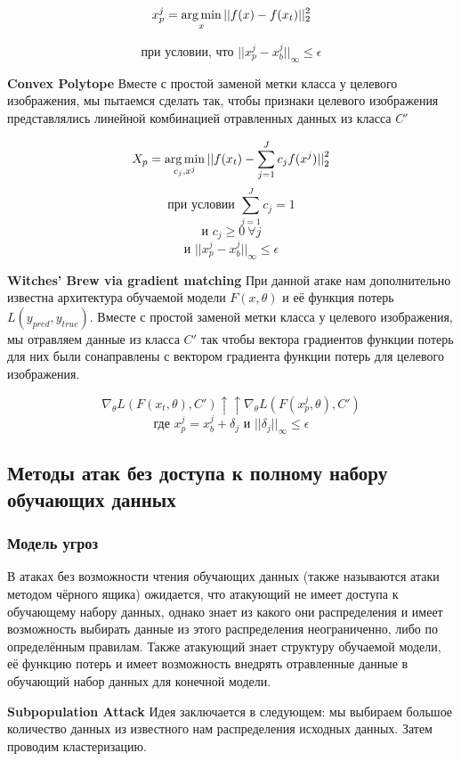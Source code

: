 $$x^{j}_{p} = \operatorname*{arg\,min}_x ||f(x)-f(x_t)||_{2}^{2}$$

$$\text{при условии, что~} ||x_{p}^{j} - x_{b}^{j}||_{\infty} \leq \epsilon$$


\textbf{Convex Polytope}
Вместе с простой заменой метки класса у целевого изображения, мы пытаемся сделать так, чтобы признаки целевого изображения представлялись линейной комбинацией отравленных данных из класса $C'$

$$X_p = \operatorname*{arg\,min}_{c_j, x^j} ||f(x_t) - \sum_{j=1}^{J} c_j f(x^j){||}_{2}^{2}$$
$$\text{при условии~} \sum_{j=1}^{J} c_j = 1$$
$$\text{и~} c_j \geq 0~\forall j$$
$$\text{и~} ||x_{p}^{j} - x_{b}^{j}||_{\infty} \leq \epsilon$$


\textbf{Witches' Brew via gradient matching}
При данной атаке нам дополнительно известна архитектура обучаемой модели $F(x, \theta)$ и её функция потерь $L(y_{pred}, y_{true})$.
Вместе с простой заменой метки класса у целевого изображения, мы отравляем данные из класса $C'$ так чтобы вектора градиентов функции потерь для них были сонаправлены с вектором градиента функции потерь для целевого изображения.

$$\nabla_{\theta} L(F(x_t, \theta), C') \uparrow\uparrow \nabla_{\theta} L(F(x_{p}^{j}, \theta), C')$$
$$\text{где~} x_{p}^{j} = x_{b}^{j} + \delta_j \text{~и~} ||\delta_j||_{\infty} \leq \epsilon$$

\subsection*{Методы атак без доступа к полному набору обучающих данных}


\subsubsection*{Модель угроз}
В атаках без возможности чтения обучающих данных (также называются атаки методом чёрного ящика) ожидается, что атакующий не имеет доступа к обучающему набору данных, однако знает из какого они распределения и имеет возможность выбирать данные из этого распределения неограниченно, либо по определённым правилам. Также атакующий знает структуру обучаемой модели, её функцию потерь и имеет возможность внедрять отравленные данные в обучающий набор данных для конечной модели.

\textbf{Subpopulation Attack}
Идея заключается в следующем: мы выбираем большое количество данных из известного нам распределения исходных данных. Затем проводим кластеризацию.

